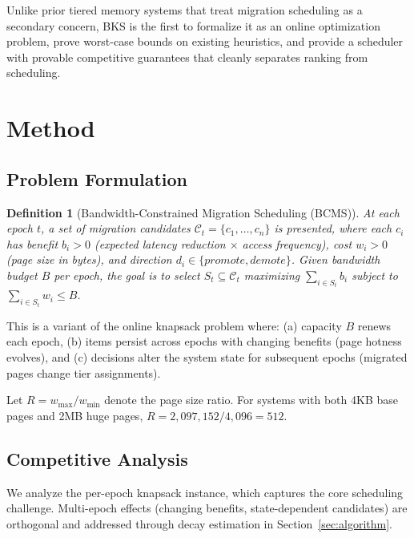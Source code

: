 \documentclass{article}
\newtheorem{definition}{Definition}
\newcommand{\bw}{B}
\newcommand{\benefit}{b}
\newcommand{\cost}{w}
\begin{document}
Unlike prior tiered memory systems that treat migration scheduling as a secondary concern, BKS is the first to formalize it as an online optimization problem, prove worst-case bounds on existing heuristics, and provide a scheduler with provable competitive guarantees that cleanly separates ranking from scheduling.

\section{Method}
\label{sec:method}

\subsection{Problem Formulation}
\label{sec:formulation}

\begin{definition}[Bandwidth-Constrained Migration Scheduling (BCMS)]
At each epoch $t$, a set of migration candidates $\mathcal{C}_t = \{c_1, \ldots, c_n\}$ is presented, where each $c_i$ has benefit $\benefit_i > 0$ (expected latency reduction $\times$ access frequency), cost $\cost_i > 0$ (page size in bytes), and direction $d_i \in \{\textit{promote}, \textit{demote}\}$. Given bandwidth budget $\bw$ per epoch, the goal is to select $S_t \subseteq \mathcal{C}_t$ maximizing $\sum_{i \in S_t} \benefit_i$ subject to $\sum_{i \in S_t} \cost_i \leq \bw$.
\end{definition}

This is a variant of the online knapsack problem where: (a) capacity $\bw$ renews each epoch, (b) items persist across epochs with changing benefits (page hotness evolves), and (c) decisions alter the system state for subsequent epochs (migrated pages change tier assignments).

Let $R = \cost_{\max} / \cost_{\min}$ denote the page size ratio. For systems with both 4KB base pages and 2MB huge pages, $R = 2{,}097{,}152 / 4{,}096 = 512$.

\subsection{Competitive Analysis}
\label{sec:theory}

We analyze the per-epoch knapsack instance, which captures the core scheduling challenge. Multi-epoch effects (changing benefits, state-dependent candidates) are orthogonal and addressed through decay estimation in Section~\ref{sec:algorithm}.
\end{document}
